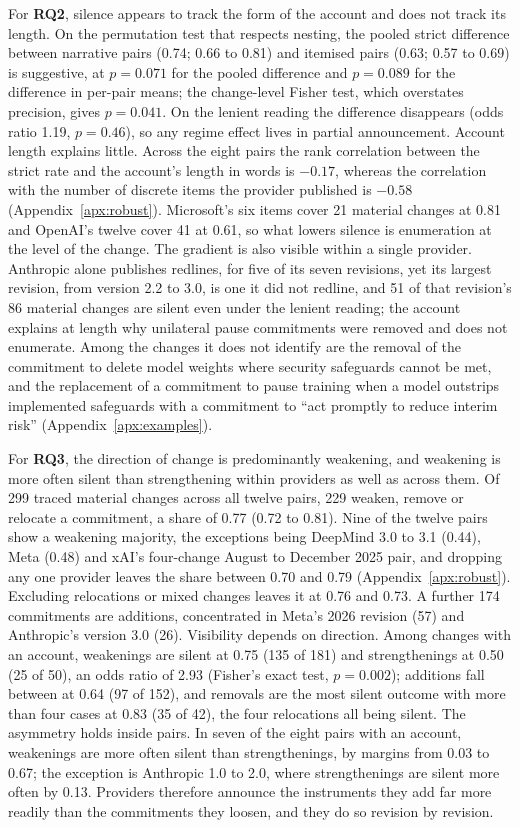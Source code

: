 \documentclass{article}
\begin{document}
For \textbf{RQ2}, silence appears to track the form of the account and does not track its length. On the permutation test that respects nesting, the pooled strict difference between narrative pairs (0.74; 0.66 to 0.81) and itemised pairs (0.63; 0.57 to 0.69) is suggestive, at $p = 0.071$ for the pooled difference and $p = 0.089$ for the difference in per-pair means; the change-level Fisher test, which overstates precision, gives $p = 0.041$. On the lenient reading the difference disappears (odds ratio 1.19, $p = 0.46$), so any regime effect lives in partial announcement. Account length explains little. Across the eight pairs the rank correlation between the strict rate and the account's length in words is $-0.17$, whereas the correlation with the number of discrete items the provider published is $-0.58$ (Appendix~\ref{apx:robust}). Microsoft's six items cover 21 material changes at 0.81 and OpenAI's twelve cover 41 at 0.61, so what lowers silence is enumeration at the level of the change. The gradient is also visible within a single provider. Anthropic alone publishes redlines, for five of its seven revisions, yet its largest revision, from version 2.2 to 3.0, is one it did not redline, and 51 of that revision's 86 material changes are silent even under the lenient reading; the account explains at length why unilateral pause commitments were removed and does not enumerate. Among the changes it does not identify are the removal of the commitment to delete model weights where security safeguards cannot be met, and the replacement of a commitment to pause training when a model outstrips implemented safeguards with a commitment to ``act promptly to reduce interim risk'' (Appendix~\ref{apx:examples}).

For \textbf{RQ3}, the direction of change is predominantly weakening, and weakening is more often silent than strengthening within providers as well as across them. Of 299 traced material changes across all twelve pairs, 229 weaken, remove or relocate a commitment, a share of 0.77 (0.72 to 0.81). Nine of the twelve pairs show a weakening majority, the exceptions being DeepMind 3.0 to 3.1 (0.44), Meta (0.48) and xAI's four-change August to December 2025 pair, and dropping any one provider leaves the share between 0.70 and 0.79 (Appendix~\ref{apx:robust}). Excluding relocations or mixed changes leaves it at 0.76 and 0.73. A further 174 commitments are additions, concentrated in Meta's 2026 revision (57) and Anthropic's version 3.0 (26). Visibility depends on direction. Among changes with an account, weakenings are silent at 0.75 (135 of 181) and strengthenings at 0.50 (25 of 50), an odds ratio of 2.93 (Fisher's exact test, $p = 0.002$); additions fall between at 0.64 (97 of 152), and removals are the most silent outcome with more than four cases at 0.83 (35 of 42), the four relocations all being silent. The asymmetry holds inside pairs. In seven of the eight pairs with an account, weakenings are more often silent than strengthenings, by margins from 0.03 to 0.67; the exception is Anthropic 1.0 to 2.0, where strengthenings are silent more often by 0.13. Providers therefore announce the instruments they add far more readily than the commitments they loosen, and they do so revision by revision.
\end{document}
